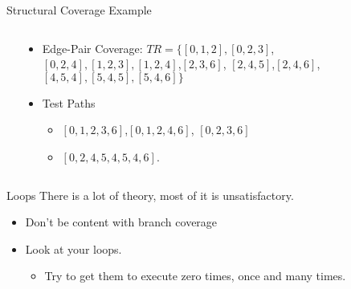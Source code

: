 \documentclass{beamer}
\begin{document}
 \begin{frame}{Structural Coverage Example}
  \begin{columns}
    \begin{column}{0.2\textwidth}
    \end{column}
    \begin{column}{0.8\textwidth}
      \begin{itemize}
      \item Edge-Pair Coverage: $TR=\{[0,1,2],[0,2,3]$,
        $[0,2,4],[1,2,3],[1,2,4]$,$[2,3,6]$, $[2,4,5]$,$[2,4,6]$,
        $[4,5,4],[5,4,5],[5,4,6]\}$
      \item Test Paths
        \begin{itemize}
        \item $[0,1,2,3,6]$,$[0,1,2,4,6]$, $[0,2,3,6]$
        \item $[0,2,4,5,4,5,4,6]$.
        \end{itemize}
      \end{itemize}
    \end{column}
  \end{columns}
\end{frame}
\begin{frame}{Loops}
There is a lot of theory, most of it is unsatisfactory. 
  \begin{itemize}
  \item Don't be content with branch coverage
  \item Look at your loops.
    \begin{itemize}
    \item Try to get them to execute zero times, once and many times.
    \end{itemize}
  \end{itemize}
  
\end{frame}
\end{document}
